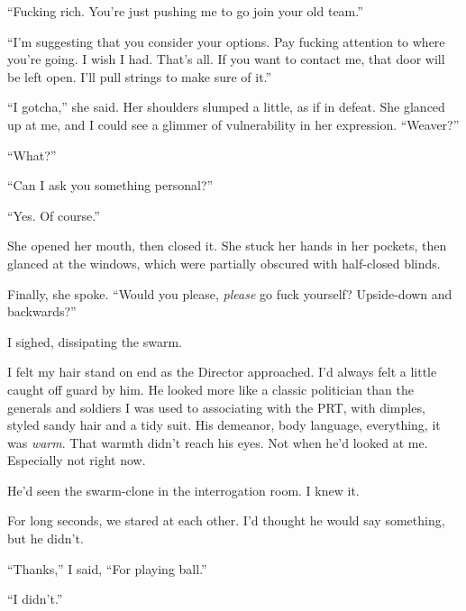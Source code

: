 ``Fucking rich.  You're just pushing me to go join your old team.''



``I'm suggesting that you consider your options.  Pay fucking attention to where you're going.  I wish I had.  That's all.  If you want to contact me, that door will be left open.  I'll pull strings to make sure of it.''



``I gotcha,'' she said.  Her shoulders slumped a little, as if in defeat.  She glanced up at me, and I could see a glimmer of vulnerability in her expression.  ``Weaver?''



``What?''



``Can I ask you something personal?''



``Yes.  Of course.''



She opened her mouth, then closed it.  She stuck her hands in her pockets, then glanced at the windows, which were partially obscured with half-closed blinds.



Finally, she spoke.  ``Would you please, \emph{please} go fuck yourself?  Upside-down and backwards?''



I sighed, dissipating the swarm.



I felt my hair stand on end as the Director approached.  I'd always felt a little caught off guard by him.  He looked more like a classic politician than the generals and soldiers I was used to associating with the PRT, with dimples, styled sandy hair and a tidy suit.  His demeanor, body language, everything, it was \emph{warm}.  That warmth didn't reach his eyes.  Not when he'd looked at me.  Especially not right now.



He'd seen the swarm-clone in the interrogation room.  I knew it.



For long seconds, we stared at each other.  I'd thought he would say something, but he didn't.



``Thanks,'' I said, ``For playing ball.''



``I didn't.''



